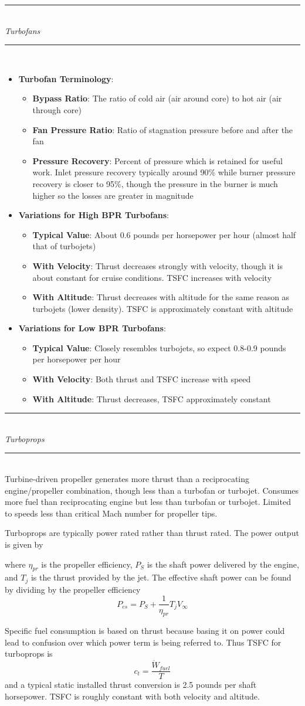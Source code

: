 \documentclass[11pt]{article}
\newcommand{\Item}[1]{\item \textbf{#1}:}
\newcommand{\Header}[1]{\noindent\rule{\textwidth}{0.4pt}\\[0.3cm]\indent \large{\textit{#1}}\normalsize{}\\[-0.1cm]\noindent\rule{\textwidth}{0.4pt}}
\newcommand{\CenteredBoxed}[1]{\begin{center}\boxed{#1}\end{center}}
\newcommand{\Vinfty}{V_\infty}
\begin{document}
\Header{Turbofans}\\
\begin{itemize}
\Item{Turbofan Terminology}
	\begin{itemize}
	\Item{Bypass Ratio} The ratio of cold air (air around core) to hot air (air through core)
	\Item{Fan Pressure Ratio} Ratio of stagnation pressure before and after the fan
	\Item{Pressure Recovery} Percent of pressure which is retained for useful work. Inlet pressure recovery typically around 90\% while burner pressure recovery is closer to 95\%, though the pressure in the burner is much higher so the losses are greater in magnitude
	\end{itemize}
\Item{Variations for High BPR Turbofans}
	\begin{itemize}
	\Item{Typical Value} About 0.6 pounds per horsepower per hour (almost half that of turbojets)
	\Item{With Velocity} Thrust decreases strongly with velocity, though it is about constant for cruise conditions. TSFC increases with velocity
	\Item{With Altitude} Thrust decreases with altitude for the same reason as turbojets (lower density). TSFC is approximately constant with altitude
	\end{itemize}
\Item{Variations for Low BPR Turbofans}
	\begin{itemize}
	\Item{Typical Value} Closely resembles turbojets, so expect 0.8-0.9 pounds per horsepower per hour
	\Item{With Velocity} Both thrust and TSFC increase with speed
	\Item{With Altitude} Thrust decreases, TSFC approximately constant
	\end{itemize}
\end{itemize}

\Header{Turboprops}\\

Turbine-driven propeller generates more thrust than a reciprocating engine/propeller combination, though less than a turbofan or turbojet. Consumes more fuel than reciprocating engine but less than turbofan or turbojet. Limited to speeds less than critical Mach number for propeller tips.

Turboprops are typically power rated rather than thrust rated. The power output is given by
\CenteredBoxed{P_A=\eta_{pr}P_S+T_j\Vinfty}
where $\eta_{pr}$ is the propeller efficiency, $P_S$ is the shaft power delivered by the engine, and $T_j$ is the thrust provided by the jet. The effective shaft power can be found by dividing by the propeller efficiency
$$P_{es}=P_S+\frac{1}{\eta_{pr}}T_j\Vinfty$$

Specific fuel consumption is based on thrust because basing it on power could lead to confusion over which power term is being referred to. Thus TSFC for turboprops is
$$c_t=\frac{\dot{W}_{fuel}}{T}$$
and a typical static installed thrust conversion is 2.5 pounds per shaft horsepower. TSFC is roughly constant with both velocity and altitude.
\end{document}
